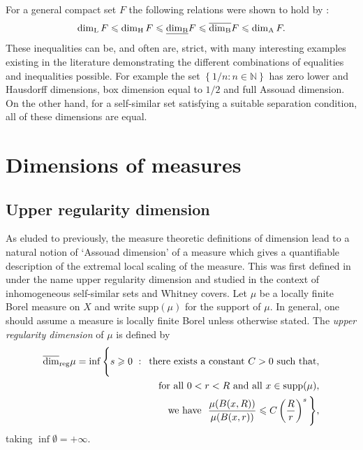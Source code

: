 For a general compact set $F$ the following relations were shown to hold by \cite{Fr, larman1, larman2}:
\[
\dim_{\textup{L}} F \leqslant \dim_{\text{H}} F \leqslant \underline{\dim_{\textup{B}}} F \leqslant \overline{\dim_{\textup{B}}} F \leqslant \dim_{\textup{A}} F.
\]
These inequalities can be, and often are, strict, with many interesting examples existing in the literature demonstrating the different combinations of equalities and inequalities possible. For example the set $\left\{1/n \colon n \in \mathbb{N} \right\}$ has zero lower and Hausdorff dimensions, box dimension equal to $1/2$ and full Assouad dimension. On the other hand, for a self-similar set satisfying a suitable separation condition, all of these dimensions are equal. 







\section{Dimensions of measures}
\label{sec:intro-measures}

\subsection{Upper regularity dimension}
\label{sec:intro-upper-reg}

As eluded to previously, the measure theoretic definitions of dimension lead to a natural notion of `Assouad dimension' of a measure which gives a quantifiable description of the extremal local scaling of the measure. This was first defined in \cite{anti1,anti2} under the name upper regularity dimension and studied in the context of inhomogeneous self-similar sets and Whitney covers. Let $\mu$ be a locally finite Borel measure on $X$ and write $\text{supp}(\mu)$ for the support of $\mu$. In general, one should assume a measure is locally finite Borel unless otherwise stated. The \textit{upper regularity dimension} of $\mu$ is defined by 
\begin{align*} 
\overline{\dim}_{\textup{reg}} \mu = \inf \Bigg\{ s \geqslant 0 \, \,  : \,  \text{ there exists a  constant }C  > 0\text{  such that,} \\ \text{for all } 0< r< R  \text{  and all }x \in \text{supp} (\mu), \\ \text{we have }  \  \frac{\mu(B(x,R))}{\mu(B(x,r))} \leqslant C\left(\frac{R}{r}\right)^{s} \Bigg\},
\end{align*}
taking $\inf \emptyset = + \infty$. 

